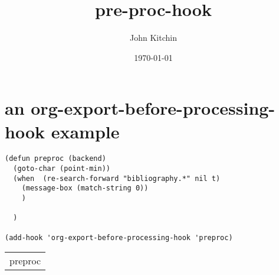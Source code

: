 \documentclass[11pt]{article}
\author{John Kitchin}
\date{\today}
\title{pre-proc-hook}
\begin{document}
\tableofcontents

\section{an org-export-before-processing-hook example}
\label{sec-1}

\begin{verbatim}
(defun preproc (backend)
  (goto-char (point-min))
  (when  (re-search-forward "bibliography.*" nil t)
    (message-box (match-string 0))
    )

  )

(add-hook 'org-export-before-processing-hook 'preproc)
\end{verbatim}

\begin{center}
\begin{tabular}{l}
preproc\\
\end{tabular}
\end{center}
\end{document}
